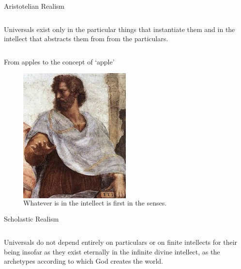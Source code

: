 \documentclass[xcolor=dvipsnames]{beamer}
\begin{document}
\begin{frame}{Aristotelian Realism}
  \begin{columns}
Universals exist {only} in the particular things that instantiate them and in the intellect that abstracts them from from the particulars.
  \end{columns}
\end{frame}


\begin{frame}{From apples to the concept of `apple'}
\begin{figure}
  \centering
  \begin{columns}
    \centering
    \includegraphics[width=0.5\textwidth]{aristotle}
    \caption{{Whatever is in the intellect is first in the senses.}}
  \end{columns}
\end{figure}
\end{frame}


\begin{frame}{Scholastic Realism}
  \begin{columns}
Universals do not depend entirely on particulars or on finite intellects for their being insofar as they exist eternally in the infinite divine intellect, as the archetypes according to which God creates the world.
  \end{columns}
\end{frame}
\end{document}

